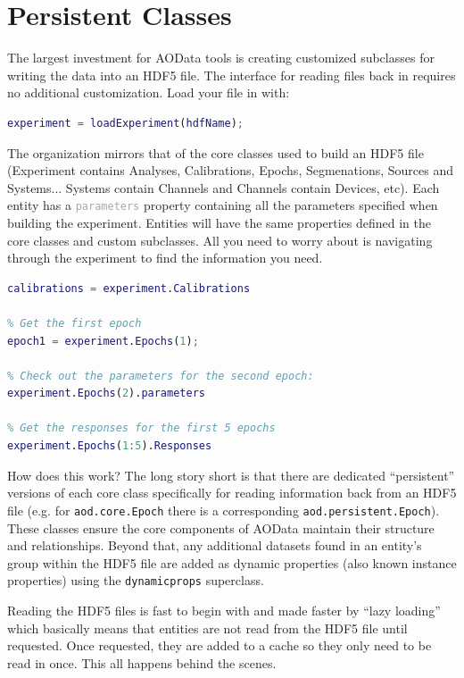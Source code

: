 \documentclass[10pt]{exam}
\newcommand\aodclass[1]{\textcolor{codeblue}{\texttt{#1}}}
\newcommand\matclass[1]{\textcolor{codeblue}{\texttt{#1}}}
\newcommand\aodprop[1]{\textcolor{darkgray}{\texttt{#1}}}
\begin{document}
\section{Persistent Classes}
	\label{section:PersistentClasses}
	\noindent The largest investment for AOData tools is creating customized subclasses for writing the data into an HDF5 file. The interface for reading files back in requires no additional customization. Load your file in with:
	\begin{lstlisting}[language=matlab]
experiment = loadExperiment(hdfName);
	\end{lstlisting}
	The organization mirrors that of the core classes used to build an HDF5 file (Experiment contains Analyses, Calibrations, Epochs, Segmenations, Sources and Systems... Systems contain Channels and Channels contain Devices, etc). Each entity has a \aodprop{parameters} property containing all the parameters specified when building the experiment. Entities will have the same properties defined in the core classes and custom subclasses. All you need to worry about is navigating through the experiment to find the information you need.
	\begin{lstlisting}[language=matlab]
% Get all the calibrations
calibrations = experiment.Calibrations

% Get the first epoch
epoch1 = experiment.Epochs(1);

% Check out the parameters for the second epoch:
experiment.Epochs(2).parameters

% Get the responses for the first 5 epochs
experiment.Epochs(1:5).Responses 
	\end{lstlisting}
	How does this work? The long story short is that there are dedicated ``persistent'' versions of each core class specifically for reading information back from an HDF5 file (e.g. for \aodclass{aod.core.Epoch} there is a corresponding \aodclass{aod.persistent.Epoch}). These classes ensure the core components of AOData maintain their structure and relationships. Beyond that, any additional datasets found in an entity's group within the HDF5 file are added as dynamic properties (also known instance properties) using the \matclass{dynamicprops} superclass.   
	
	Reading the HDF5 files is fast to begin with and made faster by ``lazy loading'' which basically means that entities are not read from the HDF5 file until requested. Once requested, they are added to a cache so they only need to be read in once. This all happens behind the scenes.
	
\end{document}

